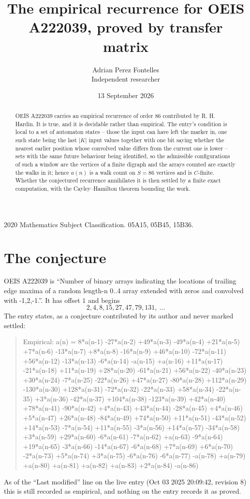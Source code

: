 \documentclass[11pt,a4paper]{article}
\title{The empirical recurrence for OEIS A222039, proved by transfer matrix}
\author{Adrian Perez Fontelles\\ \small Independent researcher}
\date{13 September 2026}
\theoremstyle{plain}
\theoremstyle{definition}
\begin{document}
\maketitle

\begin{abstract}
OEIS A222039 carries an empirical recurrence of order $86$ contributed by R. H. Hardin. It is
true, and it is decidable rather than empirical. The entry's condition is local to a set of automaton states -- those the input can have left the marker in, one such state being the last $|K|$ input values together with one bit saying whether the nearest earlier position whose convolved value differs from the current one is lower -- sets with the same future behaviour being identified, so
the admissible configurations of such a window are the vertices of a finite digraph and the
arrays counted are exactly the walks in it; hence $a(n)$ is a walk count on $S=86$ vertices
and is $C$-finite. Whether the conjectured recurrence annihilates it is then settled by a
finite exact computation, with the Cayley--Hamilton theorem bounding the work.
\end{abstract}

\noindent\small 2020 Mathematics Subject Classification. 05A15, 05B45, 15B36.\normalsize

\section{The conjecture}

OEIS A222039 is ``Number of binary arrays indicating the locations of trailing edge maxima of a random length-n 0..4 array extended with zeros and convolved with -1,2,-1.''. It has offset $1$ and begins
\[
2, 4, 8, 15, 27, 47, 79, 131,\ \dots
\]
The entry states, as a conjecture contributed by its author and never marked settled:
\begin{quote}
Empirical: a(n) = 8*a(n-1) -27*a(n-2) +49*a(n-3) -49*a(n-4) +21*a(n-5) +7*a(n-6) -13*a(n-7) +8*a(n-8) -16*a(n-9) +46*a(n-10) -72*a(n-11) +56*a(n-12) -13*a(n-13) -6*a(n-14) -a(n-15) +a(n-16) +11*a(n-17) -21*a(n-18) +11*a(n-19) +28*a(n-20) -61*a(n-21) +56*a(n-22) -40*a(n-23) +30*a(n-24) -7*a(n-25) -22*a(n-26) +47*a(n-27) -80*a(n-28) +112*a(n-29) -130*a(n-30) +128*a(n-31) -72*a(n-32) -22*a(n-33) +58*a(n-34) -22*a(n-35) +3*a(n-36) -42*a(n-37) +104*a(n-38) -123*a(n-39) +42*a(n-40) +78*a(n-41) -90*a(n-42) +4*a(n-43) +43*a(n-44) -28*a(n-45) +4*a(n-46) +5*a(n-47) +26*a(n-48) -84*a(n-49) +74*a(n-50) +11*a(n-51) -43*a(n-52) +14*a(n-53) -7*a(n-54) +11*a(n-55) -3*a(n-56) +14*a(n-57) -34*a(n-58) +3*a(n-59) +29*a(n-60) -6*a(n-61) -7*a(n-62) +a(n-63) -9*a(n-64) +19*a(n-65) -3*a(n-66) -14*a(n-67) -6*a(n-68) +7*a(n-69) +6*a(n-70) -2*a(n-73) +5*a(n-74) +3*a(n-75) -6*a(n-76) -6*a(n-77) -a(n-78) +a(n-79) +a(n-80) +a(n-81) +a(n-82) +a(n-83) +2*a(n-84) -a(n-86)
\end{quote}
As of the ``Last modified'' line on the live entry (Oct 03 2025 20:09:42, revision 8) this is still
recorded as empirical, and nothing on the entry records it as proved.
\end{document}
